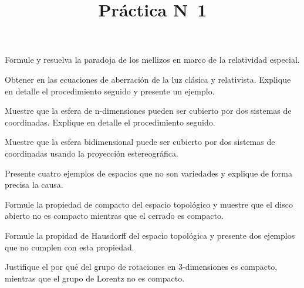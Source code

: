 \documentclass[12pt,a4paper]{practice}
\begin{document}
    \title{Práctica N\textdegree\ 1}
    \maketitle

    \begin{problem}\label{prob:1}
        Formule y resuelva la paradoja de los mellizos en marco de la relatividad especial.
    \end{problem}

    \begin{problem}\label{prob:2}
        Obtener en las ecuaciones de aberración de la luz clásica y relativista. Explique en detalle el procedimiento seguido y presente un ejemplo.
    \end{problem}

    \begin{problem}\label{prob:3}
        Muestre que la esfera de n-dimensiones pueden ser cubierto por dos sistemas de coordinadas. Explique en detalle el procedimiento seguido.    
    \end{problem}

    \begin{problem}\label{prob:4}
        Muestre que la esfera bidimensional puede ser cubierto por dos sistemas de coordinadas usando la proyección estereográfica.
    \end{problem}

    \begin{problem}\label{prob:5}
        Presente cuatro ejemplos de espacios que no son variedades y explique de forma precisa la causa.
    \end{problem}

    \begin{problem}\label{prob:6}
        Formule la propiedad de compacto del espacio topológico y muestre que el disco abierto no es compacto mientras que el cerrado es compacto.
    \end{problem}

    \begin{problem}\label{prob:7}
        Formule la propidad de Hausdorff del espacio topológica y presente dos ejemplos que no cumplen con esta propiedad.
    \end{problem}

    \begin{problem}\label{prob:8}
        Justifique el por qué del grupo de rotaciones en 3-dimensiones es compacto, mientras que el grupo de Lorentz no es compacto.
    \end{problem}
    
\end{document}
